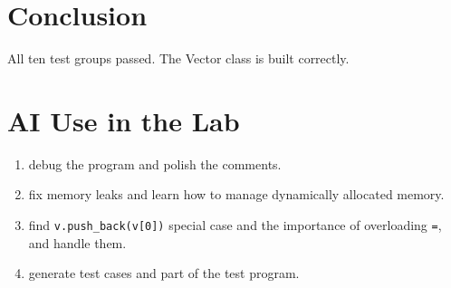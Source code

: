 \documentclass[10pt,a4paper]{article}
\begin{document}
\section{Conclusion}
All ten test groups passed. The Vector class is built correctly.

\section{AI Use in the Lab}
\begin{enumerate}
  \item debug the program and polish the comments.
  \item fix memory leaks and learn how to manage dynamically allocated memory.
  \item find \texttt{v.push\_back(v[0])} special case and the importance of overloading \texttt{=}, and handle them.
  \item generate test cases and part of the test program.
\end{enumerate}
\end{document}
